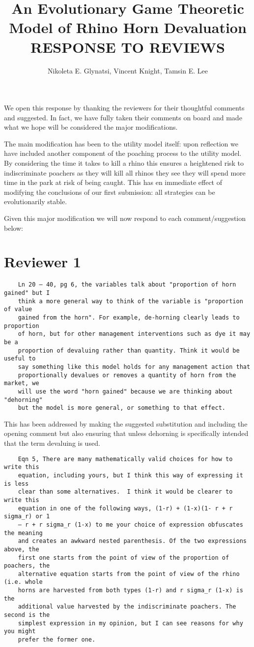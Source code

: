 \documentclass[10pt]{article}
\title{An Evolutionary Game Theoretic Model of Rhino Horn Devaluation RESPONSE
       TO REVIEWS}
\author{Nikoleta E. Glynatsi, Vincent Knight, Tamsin E. Lee} %
\begin{document}
We open this response by thanking the reviewers for their thoughtful comments
and suggested. In fact, we have fully taken their comments on board and
made what we hope will be considered the major modifications.

The main modification has been to the utility model itself: upon reflection we
have included another component of the poaching process to the utility model. By
considering the time it takes to kill a rhino this ensures a heightened risk to
indiscriminate poachers as they will kill all rhinos they see they will spend
more time in the park at risk of being caught. This has en immediate effect of
modifying the conclusions of our first submission: all strategies can
be evolutionarily stable.

Given this major modification we will now respond to each comment/suggestion
below:


\section{Reviewer 1}

\begin{verbatim}
    Ln 20 – 40, pg 6, the variables talk about "proportion of horn gained" but I
    think a more general way to think of the variable is "proportion of value
    gained from the horn". For example, de-horning clearly leads to proportion
    of horn, but for other management interventions such as dye it may be a
    proportion of devaluing rather than quantity. Think it would be useful to
    say something like this model holds for any management action that
    proportionally devalues or removes a quantity of horn from the market, we
    will use the word "horn gained" because we are thinking about "dehorning"
    but the model is more general, or something to that effect.
\end{verbatim}

This has been addressed by making the suggested substitution and including the
opening comment but also ensuring
that unless dehorning is specifically intended that the term devaluing is used.

\begin{verbatim}
    Eqn 5, There are many mathematically valid choices for how to write this
    equation, including yours, but I think this way of expressing it is less
    clear than some alternatives.  I think it would be clearer to write this
    equation in one of the following ways, (1-r) + (1-x)(1- r + r sigma_r) or 1
    – r + r sigma_r (1-x) to me your choice of expression obfuscates the meaning
    and creates an awkward nested parenthesis. Of the two expressions above, the
    first one starts from the point of view of the proportion of poachers, the
    alternative equation starts from the point of view of the rhino (i.e. whole
    horns are harvested from both types (1-r) and r sigma_r (1-x) is the
    additional value harvested by the indiscriminate poachers. The second is the
    simplest expression in my opinion, but I can see reasons for why you might
    prefer the former one.
\end{verbatim}
\end{document}
